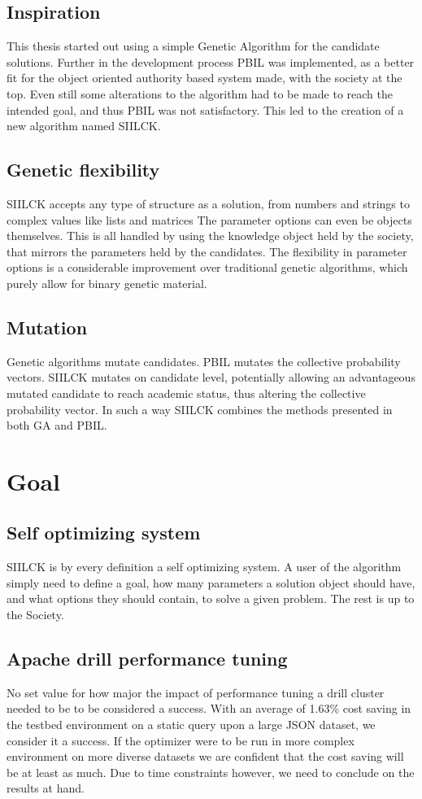 \documentclass[a4paper,english]{report}
\begin{document}
		\subsection{Inspiration}
		This thesis started out using a simple Genetic Algorithm for the candidate solutions. Further in the development process PBIL was implemented, as a better fit for the object oriented authority based system made, with the society at the top. Even still some alterations to the algorithm had to be made to reach the intended goal, and thus PBIL was not satisfactory. This led to the creation of a new algorithm named SIILCK.
		\subsection{Genetic flexibility}
		SIILCK accepts any type of structure as a solution, from numbers and strings to complex values like lists and matrices The parameter options can even be objects themselves. This is all handled by using the knowledge object held by the society, that mirrors the parameters held by the candidates. The flexibility in parameter options is a considerable improvement over traditional genetic algorithms, which purely allow for binary genetic material.
		\subsection{Mutation}
		Genetic algorithms mutate candidates. PBIL mutates the collective probability vectors. SIILCK mutates on candidate level, potentially allowing an advantageous mutated candidate to reach academic status, thus altering the collective probability vector. In such a way SIILCK combines the methods presented in both GA and PBIL.
		\clearpage
		\section{Goal}
		\subsection{Self optimizing system}
		SIILCK is by every definition a self optimizing system. A user of the algorithm simply need to define a goal, how many parameters a solution object should have, and what options they should contain, to solve a given problem. The rest is up to the Society.
		\subsection{Apache drill performance tuning}
		No set value for how major the impact of performance tuning a drill cluster needed to be to be considered a success. With an average of 1.63\% cost saving in the testbed environment on a static query upon a large JSON dataset, we consider it a success. If the optimizer were to be run in more complex environment on more diverse datasets we are confident that the cost saving will be at least as much. Due to time constraints however, we need to conclude on the results at hand.
\end{document}
